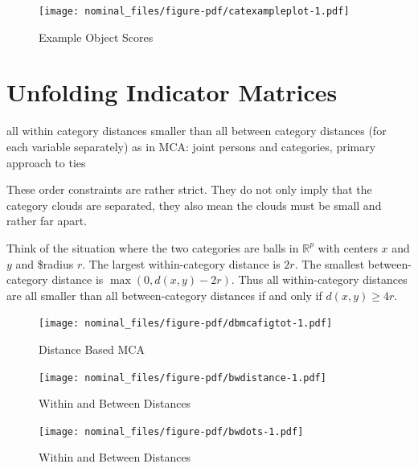 \documentclass[
  12pt,
  letterpaper,
  DIV=11,
  numbers=noendperiod]{scrreprt}
\theoremstyle{remark}
\begin{document}
\begin{figure}[H]

{\centering \texttt{[image: nominal\_files/figure-pdf/catexampleplot-1.pdf]}

}

\caption{Example Object Scores}

\end{figure}%

\section{Unfolding Indicator
Matrices}\label{unfolding-indicator-matrices}

all within category distances smaller than all between category
distances (for each variable separately) as in MCA: joint persons and
categories, primary approach to ties

These order constraints are rather strict. They do not only imply that
the category clouds are separated, they also mean the clouds must be
small and rather far apart.

Think of the situation where the two categories are balls in
\(\mathbb{R}^p\) with centers \(x\) and \(y\) and \$radius \(r\). The
largest within-category distance is \(2r\). The smallest
between-category distance is \(\max(0,d(x,y)-2r)\). Thus all
within-category distances are all smaller than all between-category
distances if and only if \(d(x,y)\geq 4r\).

\begin{figure}[H]

{\centering \texttt{[image: nominal\_files/figure-pdf/dbmcafigtot-1.pdf]}

}

\caption{Distance Based MCA}

\end{figure}%

\begin{figure}[H]

{\centering \texttt{[image: nominal\_files/figure-pdf/bwdistance-1.pdf]}

}

\caption{Within and Between Distances}

\end{figure}%

\begin{figure}[H]

{\centering \texttt{[image: nominal\_files/figure-pdf/bwdots-1.pdf]}

}

\caption{Within and Between Distances}

\end{figure}%
\end{document}
